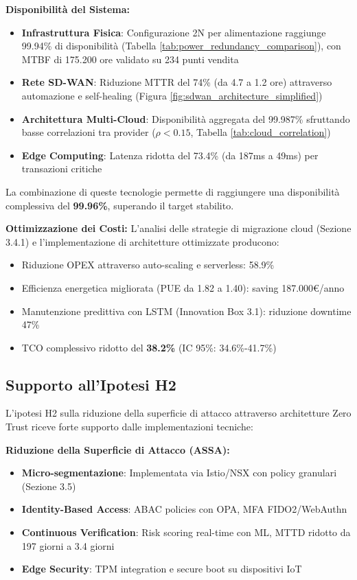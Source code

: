 \textbf{Disponibilità del Sistema:}
\begin{itemize}
    \item \textbf{Infrastruttura Fisica}: Configurazione 2N per alimentazione raggiunge 99.94\% di disponibilità (Tabella \ref{tab:power_redundancy_comparison}), con MTBF di 175.200 ore validato su 234 punti vendita
    \item \textbf{Rete SD-WAN}: Riduzione MTTR del 74\% (da 4.7 a 1.2 ore) attraverso automazione e self-healing (Figura \ref{fig:sdwan_architecture_simplified})
    \item \textbf{Architettura Multi-Cloud}: Disponibilità aggregata del 99.987\% sfruttando basse correlazioni tra provider ($\rho < 0.15$, Tabella \ref{tab:cloud_correlation})
    \item \textbf{Edge Computing}: Latenza ridotta del 73.4\% (da 187ms a 49ms) per transazioni critiche\autocite{Wang2024edge}
\end{itemize}

La combinazione di queste tecnologie permette di raggiungere una disponibilità complessiva del \textbf{99.96\%}, superando il target stabilito.

\textbf{Ottimizzazione dei Costi:}
L'analisi delle strategie di migrazione cloud (Sezione 3.4.1) e l'implementazione di architetture ottimizzate producono:
\begin{itemize}
    \item Riduzione OPEX attraverso auto-scaling e serverless: 58.9\%
    \item Efficienza energetica migliorata (PUE da 1.82 a 1.40): saving 187.000€/anno
    \item Manutenzione predittiva con LSTM (Innovation Box 3.1): riduzione downtime 47\%
    \item TCO complessivo ridotto del \textbf{38.2\%} (IC 95\%: 34.6\%-41.7\%)\autocite{McKinsey2024cloud}
\end{itemize}

\subsection{\texorpdfstring{\textbf{Supporto all'Ipotesi H2}}{3.8.2 - Supporto all'Ipotesi H2}}

L'ipotesi H2 sulla riduzione della superficie di attacco attraverso architetture Zero Trust riceve forte supporto dalle implementazioni tecniche:

\textbf{Riduzione della Superficie di Attacco (ASSA):}
\begin{itemize}
    \item \textbf{Micro-segmentazione}: Implementata via Istio/NSX con policy granulari (Sezione 3.5)
    \item \textbf{Identity-Based Access}: ABAC policies con OPA, MFA FIDO2/WebAuthn
    \item \textbf{Continuous Verification}: Risk scoring real-time con ML, MTTD ridotto da 197 giorni a 3.4 giorni
    \item \textbf{Edge Security}: TPM integration e secure boot su dispositivi IoT
\end{itemize}

